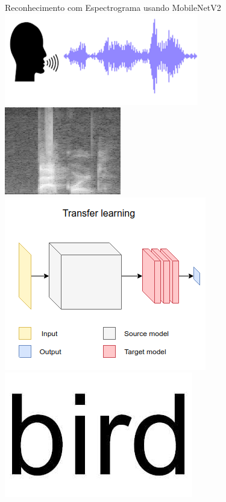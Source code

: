 \documentclass[10pt, compress]{beamer}
\begin{document}
\begin{frame}{Reconhecimento com Espectrograma usando MobileNetV2}
\includegraphics[scale=0.35]{images/process-11.png}
\includegraphics[scale=0.15]{images/process-2.png}
\includegraphics[scale=0.3]{images/process-3.png}
\includegraphics[scale=0.01]{images/process-4.jpg}
\end{frame}
\end{document}
